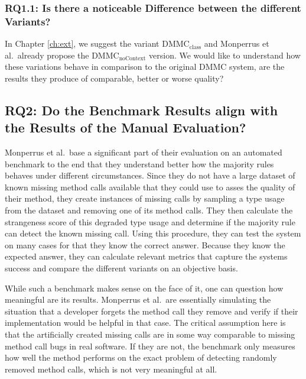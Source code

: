 \subsubsection{RQ1.1: Is there a noticeable Difference between the different Variants?}

In Chapter \ref{ch:ext}, we suggest the variant $\text{DMMC}_\text{class}$ and Monperrus et al.\ already propose the $\text{DMMC}_\text{noContext}$ version.
We would like to understand how these variations behave in comparison to the original $\text{DMMC}$ system, are the results they produce of comparable, better or worse quality?

\subsection{RQ2: Do the Benchmark Results align with the Results of the Manual Evaluation?}

Monperrus et al.\ base a significant part of their evaluation on an automated benchmark to the end that they understand better how the majority rules behaves under different circumstances.
Since they do not have a large dataset of known missing method calls available that they could use to asses the quality of their method, they create instances of missing calls by sampling a type usage from the dataset and removing one of its method calls.
They then calculate the strangeness score of this degraded type usage and determine if the majority rule can detect the known missing call.
Using this procedure, they can test the system on many cases for that they know the correct answer.
Because they know the expected answer, they can calculate relevant metrics that capture the systems success and compare the different variants on an objective basis.

While such a benchmark makes sense on the face of it, one can question how meaningful are its results.
Monperrus et al.\ are essentially simulating the situation that a developer forgets the method call they remove and verify if their implementation would be helpful in that case.
The critical assumption here is that the artificially created missing calls are in some way comparable to missing method call bugs in real software.
If they are not, the benchmark only measures how well the method performs on the exact problem of detecting randomly removed method calls, which is not very meaningful at all.

